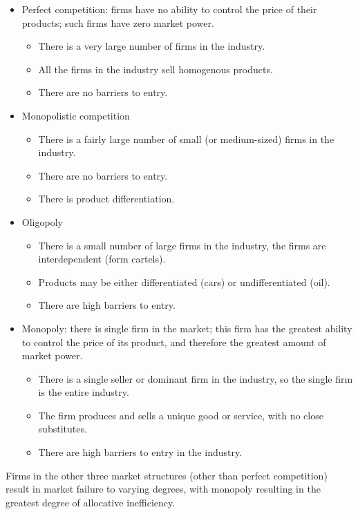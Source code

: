 \documentclass[a4paper,12pt]{article}
\begin{document}
\begin{itemize}
  \item Perfect competition: firms have no ability to control the price of their products; such firms have zero market power.
  \begin{itemize}
    \item There is a very large number of firms in the industry.
    \item All the firms in the industry sell homogenous products.
    \item There are no barriers to entry.
  \end{itemize}
  \item Monopolistic competition
  \begin{itemize}
    \item There is a fairly large number of small (or medium-­sized) firms in the industry.
    \item There are no barriers to entry.
    \item There is product differentiation.
  \end{itemize}
  \item Oligopoly
  \begin{itemize}
    \item There is a small number of large firms in the industry, the firms are interdependent (form cartels).
    \item Products may be either differentiated (cars) or undifferentiated (oil).
    \item There are high barriers to entry.
  \end{itemize}
  \item Monopoly: there is single firm in the market; this firm has the greatest ability to control the price of its product, and therefore the greatest amount of market power.
  \begin{itemize}
    \item There is a single seller or dominant firm in the industry, so the single firm is the entire industry.
    \item The firm produces and sells a unique good or service, with no close substitutes.
    \item There are high barriers to entry in the industry.
  \end{itemize}
\end{itemize}
Firms in the other three market structures (other than perfect competition) result in market failure to varying degrees, with monopoly resulting in the greatest degree of allocative inefficiency.\\
\end{document}
